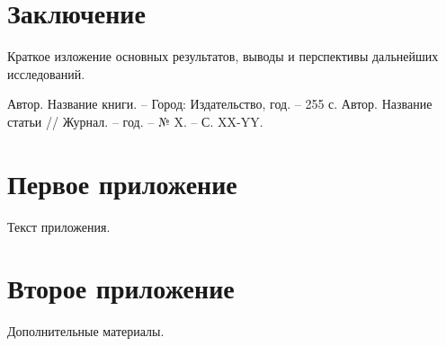 \documentclass[a4paper,14pt]{extreport} %
\begin{document}
\chapter*{Заключение}
Краткое изложение основных результатов, выводы и перспективы дальнейших исследований.

\begin{thebibliography}{99}
 Автор. Название книги. -- Город: Издательство, год. -- 255 с.
 Автор. Название статьи // Журнал. -- год. -- № X. -- С. XX-YY.
\end{thebibliography}

\appendix
\chapter{Первое приложение}
Текст приложения.

\chapter{Второе приложение}
Дополнительные материалы.
\end{document}
